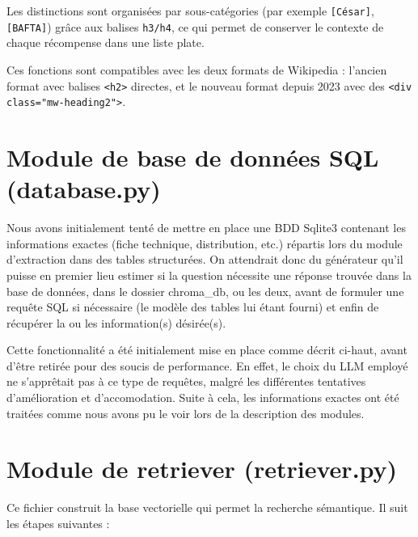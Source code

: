 \documentclass[11pt]{report}
\begin{document}
    Les distinctions sont organisées par sous-catégories (par exemple \texttt{[César]}, \texttt{[BAFTA]}) grâce aux balises \texttt{h3/h4}, ce qui permet de conserver le contexte de chaque récompense dans une liste plate.

    Ces fonctions sont compatibles avec les deux formats de Wikipedia : l'ancien format avec balises \texttt{<h2>} directes, et le nouveau format depuis 2023 avec des \verb|<div class="mw-heading2">|.
 
    \section{Module de base de données SQL (database.py)}
 
    Nous avons initialement tenté de mettre en place une BDD Sqlite3 contenant les informations exactes (fiche technique, distribution, etc.) répartis lors du module d'extraction dans des tables structurées.
    On attendrait donc du générateur qu'il puisse en premier lieu estimer si la question nécessite une réponse trouvée dans la base de données, dans le dossier chroma\_db, ou les deux, avant de formuler une requête SQL si nécessaire (le modèle des tables lui étant fourni) et enfin de récupérer la ou les information(s) désirée(s).

    Cette fonctionnalité a été initialement mise en place comme décrit ci-haut, avant d'être retirée pour des soucis de performance. En effet, le choix du LLM employé ne s'apprêtait pas à ce type de requêtes, malgré les différentes tentatives d'amélioration et d'accomodation.
    Suite à cela, les informations exactes ont été traitées comme nous avons pu le voir lors de la description des modules.
    
    \section{Module de retriever (retriever.py)}
 
    Ce fichier construit la base vectorielle qui permet la recherche sémantique. Il suit les étapes suivantes :
 
\end{document}
